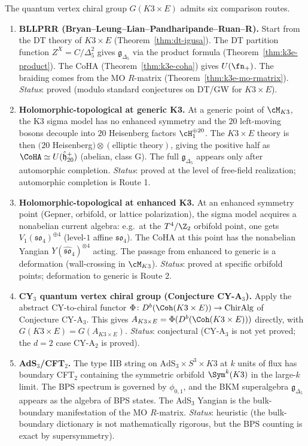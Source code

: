 The quantum vertex chiral group $G(K3 \times E)$ admits six comparison routes.

\begin{enumerate}[label=\textbf{Route \arabic*.}, leftmargin=*]
 \item \textbf{BLLPRR (Bryan--Leung--Lian--Pandharipande--Ruan--R).} Start from the DT theory of $K3 \times E$ (Theorem~\ref{thm:dt-igusa}). The DT partition function $Z^X = C / \Delta_5^2$ gives $\mathfrak{g}_{\Delta_5}$ via the product formula (Theorem~\ref{thm:k3e-product}). The CoHA (Theorem~\ref{thm:k3e-coha}) gives $U(\fn_+)$. The braiding comes from the MO $R$-matrix (Theorem~\ref{thm:k3e-mo-rmatrix}). \emph{Status}: proved (modulo standard conjectures on DT/GW for $K3 \times E$).

 \item \textbf{Holomorphic-topological at generic K3.} At a generic point of $\cM_{K3}$, the K3 sigma model has no enhanced symmetry and the $20$ left-moving bosons decouple into $20$ Heisenberg factors $\cH_1^{\oplus 20}$. The $K3 \times E$ theory is then $(20$ Heisenberg$) \otimes (\text{elliptic theory})$, giving the positive half as $\CoHA \simeq U(\hat{\mathfrak{h}}_{20}^+)$ (abelian, class G). The full $\mathfrak{g}_{\Delta_5}$ appears only after automorphic completion. \emph{Status}: proved at the level of free-field realization; automorphic completion is Route 1.

 \item \textbf{Holomorphic-topological at enhanced K3.} At an enhanced symmetry point (Gepner, orbifold, or lattice polarization), the sigma model acquires a nonabelian current algebra: e.g.\ at the $T^4/\Z_2$ orbifold point, one gets $V_1(\mathfrak{so}_4)^{\oplus 4}$ (level-$1$ affine $\mathfrak{so}_4$). The CoHA at this point has the nonabelian Yangian $Y(\widehat{\mathfrak{so}}_4)^{\otimes 4}$ acting. The passage from enhanced to generic is a deformation (wall-crossing in $\cM_{K3}$). \emph{Status}: proved at specific orbifold points; deformation to generic is Route 2.

 \item \textbf{CY$_3$ quantum vertex chiral group (Conjecture CY-A$_3$).} Apply the abstract CY-to-chiral functor $\Phi \colon D^b(\Coh(K3 \times E)) \to \text{ChirAlg}$ of Conjecture CY-A$_3$. This gives $A_{K3 \times E} = \Phi(D^b(\Coh(K3 \times E)))$ directly, with $G(K3 \times E) = G(A_{K3 \times E})$. \emph{Status}: conjectural (CY-A$_3$ is not yet proved; the $d=2$ case CY-A$_2$ is proved).

 \item \textbf{AdS$_3$/CFT$_2$.} The type IIB string on $\mathrm{AdS}_3 \times S^3 \times K3$ at $k$ units of flux has boundary CFT$_2$ containing the symmetric orbifold $\Sym^k(K3)$ in the large-$k$ limit. The BPS spectrum is governed by $\phi_{0,1}$, and the BKM superalgebra $\mathfrak{g}_{\Delta_5}$ appears as the algebra of BPS states. The AdS$_3$ Yangian is the bulk-boundary manifestation of the MO $R$-matrix. \emph{Status}: heuristic (the bulk-boundary dictionary is not mathematically rigorous, but the BPS counting is exact by supersymmetry).


\end{enumerate}
